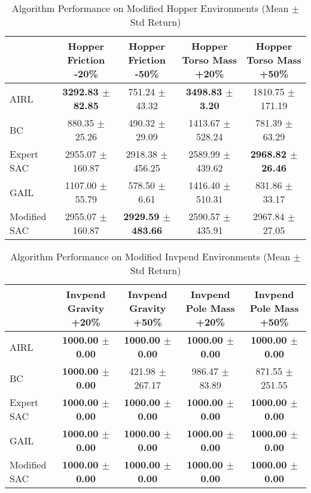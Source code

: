 
\begin{table}
\caption{Algorithm Performance on Modified Hopper Environments (Mean $\pm$ Std Return)}
\label{tab:perf_mod_hopper}
\begin{adjustbox}{max width=\textwidth, center}
\begin{tabular}{lcccc}
\toprule
 & Hopper Friction -20\% & Hopper Friction -50\% & Hopper Torso Mass +20\% & Hopper Torso Mass +50\% \\
\midrule
AIRL & \textbf{3292.83 $\pm$ 82.85} & 751.24 $\pm$ 43.32 & \textbf{3498.83 $\pm$ 3.20} & 1810.75 $\pm$ 171.19 \\
BC & 880.35 $\pm$ 25.26 & 490.32 $\pm$ 29.09 & 1413.67 $\pm$ 528.24 & 781.39 $\pm$ 63.29 \\
Expert SAC & 2955.07 $\pm$ 160.87 & 2918.38 $\pm$ 456.25 & 2589.99 $\pm$ 439.62 & \textbf{2968.82 $\pm$ 26.46} \\
GAIL & 1107.00 $\pm$ 55.79 & 578.50 $\pm$ 6.61 & 1416.40 $\pm$ 510.31 & 831.86 $\pm$ 33.17 \\
Modified SAC & 2955.07 $\pm$ 160.87 & \textbf{2929.59 $\pm$ 483.66} & 2590.57 $\pm$ 435.91 & 2967.84 $\pm$ 27.05 \\
\bottomrule
\end{tabular}
\end{adjustbox}
\end{table}



\begin{table}
\caption{Algorithm Performance on Modified Invpend Environments (Mean $\pm$ Std Return)}
\label{tab:perf_mod_invpend}
\begin{adjustbox}{max width=\textwidth, center}
\begin{tabular}{lcccc}
\toprule
 & Invpend Gravity +20\% & Invpend Gravity +50\% & Invpend Pole Mass +20\% & Invpend Pole Mass +50\% \\
\midrule
AIRL & \textbf{1000.00 $\pm$ 0.00} & \textbf{1000.00 $\pm$ 0.00} & \textbf{1000.00 $\pm$ 0.00} & \textbf{1000.00 $\pm$ 0.00} \\
BC & \textbf{1000.00 $\pm$ 0.00} & 421.98 $\pm$ 267.17 & 986.47 $\pm$ 83.89 & 871.55 $\pm$ 251.55 \\
Expert SAC & \textbf{1000.00 $\pm$ 0.00} & \textbf{1000.00 $\pm$ 0.00} & \textbf{1000.00 $\pm$ 0.00} & \textbf{1000.00 $\pm$ 0.00} \\
GAIL & \textbf{1000.00 $\pm$ 0.00} & \textbf{1000.00 $\pm$ 0.00} & \textbf{1000.00 $\pm$ 0.00} & \textbf{1000.00 $\pm$ 0.00} \\
Modified SAC & \textbf{1000.00 $\pm$ 0.00} & \textbf{1000.00 $\pm$ 0.00} & \textbf{1000.00 $\pm$ 0.00} & \textbf{1000.00 $\pm$ 0.00} \\
\bottomrule
\end{tabular}
\end{adjustbox}
\end{table}


